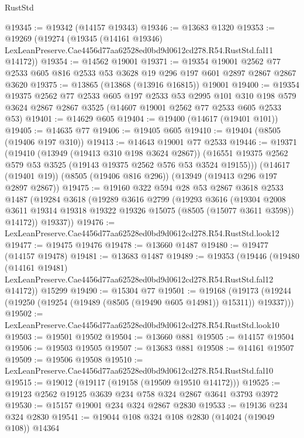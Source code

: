\begin{lexlean}{RustStd}
\begin{coremodule}
@19345 := @19342 (@14157 @19343)
@19346 := @13683 @1320
@19353 := @19269
    (@19274
      (@19345
        (@14161 @19346)
        LexLeanPreserve.Cae4456d77aa62528ed0bd9d0612cd278.R54.RustStd.fal11
        @14172))
@19354 := @14562 @19001
@19371 := @19354
    @19001
    @2562
    @77
    @2533
    @605
    @816
    @2533
    @53
    @3628
    @19
    @296
    @197
    @601
    @2897
    @2867
    @2867
    @3620
@19375 := @13865 (@13868 (@13916 @16815)) @19001
@19400 := @19354
    @19375
    @2562
    @77
    @2533
    @605
    @197
    @2533
    @53
    @2995
    @101
    @310
    @198
    @579
    @3624
    @2867
    @2867
    @3525
    (@14607 @19001 @2562 @77 @2533 @605 @2533 @53)
@19401 := @14629 @605
@19404 := @19400 (@14617 (@19401 @101))
@19405 := @14635 @77
@19406 := @19405 @605
@19410 := @19404 (@8505 (@19406 @197 @310))
@19413 := @14643 @19001 @77 @2533
@19446 := @19371
    (@19410
      (@13949 (@19413 @310 @198 @3624 @2867))
      (@16551 @19375 @2562 @579 @53 @3525 (@19143 @19375 @2562 @576 @53 @3524 @19155)))
    (@14617 (@19401 @19))
    (@8505 (@19406 @816 @296))
    (@13949 (@19413 @296 @197 @2897 @2867))
@19475 := @19160
    @322
    @594
    @28
    @53
    @2867
    @3618
    @2533
    @1487
    (@19284
      @3618
      (@19289
        @3616
        @2799
        (@19293
          @3616
          (@19304
            @2008
            @3611
            @19314
            @19318
            @19322
            @19326
            @15075
            (@8505 (@15077 @3611 @3598))
            @14172))
        @19337))
@19476 := LexLeanPreserve.Cae4456d77aa62528ed0bd9d0612cd278.R54.RustStd.look12
@19477 := @19475 @19476
@19478 := @13660 @1487
@19480 := @19477 (@14157 @19478)
@19481 := @13683 @1487
@19489 := @19353
    (@19446
      (@19480
        (@14161 @19481)
        LexLeanPreserve.Cae4456d77aa62528ed0bd9d0612cd278.R54.RustStd.fal12
        @14172))
    @15299
@19490 := @15304 @77
@19501 := @19168
    (@19173 (@19244 (@19250 (@19254 (@19489 (@8505 (@19490 @605 @14981)) @15311)) @19337)))
@19502 := LexLeanPreserve.Cae4456d77aa62528ed0bd9d0612cd278.R54.RustStd.look10
@19503 := @19501 @19502
@19504 := @13660 @881
@19505 := @14157 @19504
@19506 := @19503 @19505
@19507 := @13683 @881
@19508 := @14161 @19507
@19509 := @19506 @19508
@19510 := LexLeanPreserve.Cae4456d77aa62528ed0bd9d0612cd278.R54.RustStd.fal10
@19515 := @19012 (@19117 (@19158 (@19509 @19510 @14172)))
@19525 := @19123 @2562 @19125 @3639 @234 @758 @324 @2867 @3641 @3793 @3972
@19530 := @15157 @19001 @234 @324 @2867 @2830
@19533 := @19136 @234 @324 @2830
@19541 := @19044 @108 @324 @108 @2830 (@14024 (@19049 @108)) @14364

\end{coremodule}
\end{lexlean}
